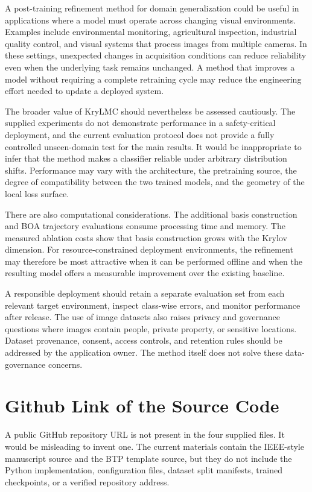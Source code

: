 \documentclass[11pt,a4paper]{article}
\begin{document}
A post-training refinement method for domain generalization could be useful in applications where a model must operate across changing visual environments. Examples include environmental monitoring, agricultural inspection, industrial quality control, and visual systems that process images from multiple cameras. In these settings, unexpected changes in acquisition conditions can reduce reliability even when the underlying task remains unchanged. A method that improves a model without requiring a complete retraining cycle may reduce the engineering effort needed to update a deployed system.

The broader value of KryLMC should nevertheless be assessed cautiously. The supplied experiments do not demonstrate performance in a safety-critical deployment, and the current evaluation protocol does not provide a fully controlled unseen-domain test for the main results. It would be inappropriate to infer that the method makes a classifier reliable under arbitrary distribution shifts. Performance may vary with the architecture, the pretraining source, the degree of compatibility between the two trained models, and the geometry of the local loss surface.

There are also computational considerations. The additional basis construction and BOA trajectory evaluations consume processing time and memory. The measured ablation costs show that basis construction grows with the Krylov dimension. For resource-constrained deployment environments, the refinement may therefore be most attractive when it can be performed offline and when the resulting model offers a measurable improvement over the existing baseline.

A responsible deployment should retain a separate evaluation set from each relevant target environment, inspect class-wise errors, and monitor performance after release. The use of image datasets also raises privacy and governance questions where images contain people, private property, or sensitive locations. Dataset provenance, consent, access controls, and retention rules should be addressed by the application owner. The method itself does not solve these data-governance concerns.

\section{Github Link of the Source Code}

A public GitHub repository URL is not present in the four supplied files. It would be misleading to invent one. The current materials contain the IEEE-style manuscript source and the BTP template source, but they do not include the Python implementation, configuration files, dataset split manifests, trained checkpoints, or a verified repository address.
\end{document}
